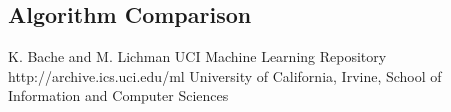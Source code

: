 \documentclass{sig-alternate}
\begin{document}
\subsection{Algorithm Comparison}





\begin{thebibliography}{10}

K. Bache and M. Lichman
\newblock UCI Machine Learning Repository
\newblock http://archive.ics.uci.edu/ml
\newblock University of California, Irvine, School of Information and Computer Sciences


\end{thebibliography}
\end{document}
